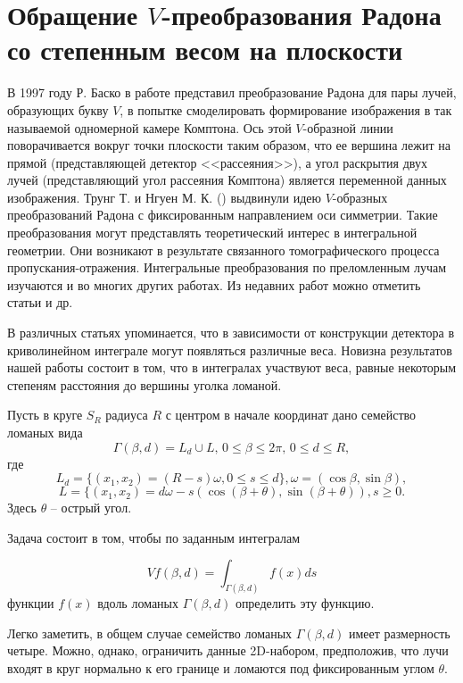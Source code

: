 \chapter{Обращение $V$-преобразования Радона со степенным весом на плоскости}\label{MZG}

В 1997 году Р. Баско в работе \cite{mzg-Basko} представил преобразование Радона для пары лучей, образующих букву $V$, в попытке смоделировать формирование изображения в так называемой одномерной камере Комптона. Ось этой $V$-образной линии поворачивается вокруг точки плоскости таким образом, что ее вершина лежит на прямой (представляющей детектор <<рассеяния>>), а угол раскрытия двух лучей (представляющий угол рассеяния Комптона) является переменной данных изображения.
Трунг Т. и Нгуен М. К. (\cite{mzg-Truong}) выдвинули идею $V$-образных преобразований Радона с фиксированным направлением оси симметрии. Такие преобразования могут представлять теоретический интерес в интегральной геометрии. Они возникают в результате связанного томографического процесса пропускания-отражения. Интегральные преобразования по преломленным лучам изучаются и во многих других работах. Из недавних работ можно отметить статьи \cite{mzg-Ambartsoumian2,mzg-Kuchment} и др.

В различных статьях упоминается, что в зависимости от конструкции детектора в криволинейном интеграле могут появляться различные веса. Новизна результатов нашей работы состоит в том, что в интегралах участвуют веса, равные некоторым степеням расстояния до вершины уголка ломаной.

Пусть в круге $S_R$ радиуса $R$ с центром в начале координат дано семейство ломаных вида
$$\Gamma(\beta,d)=L_d\cup L, \, 0\leq\beta\leq 2\pi, \, 0\leq d\leq R,$$
где
$$L_d=\{(x_1, x_2)=(R-s)\omega,  0\leq s\leq d\}, \omega=(\cos\beta, \sin \beta),$$
$$L=\{(x_1, x_2)=d\omega-s(\cos (\beta+\theta), \sin (\beta+\theta)), s\geq 0.$$
Здесь $\theta$ -- острый угол.

Задача состоит в том, чтобы по заданным интегралам

\begin{equation}
\label{mzg-eq-one3}
Vf(\beta,d)=\int_{\Gamma(\beta,d)}f(x)ds
\end{equation}
функции $f(x)$ вдоль ломаных $\Gamma(\beta,d)$ определить эту функцию.

Легко заметить, в общем случае семейство ломаных $\Gamma(\beta,d)$ имеет размерность четыре. Можно, однако, ограничить данные 2D-набором, предположив, что лучи входят в круг нормально к его границе и ломаются под фиксированным углом $\theta$.


